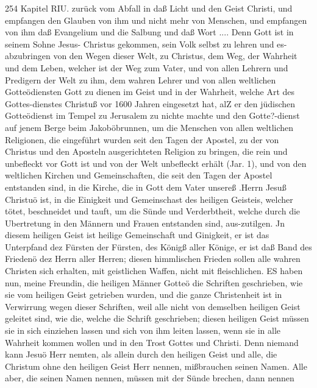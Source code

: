 254 Kapitel RIU.
zurück vom Abfall in daß Licht und den Geist Christi, und
empfangen den Glauben von ihm und nicht mehr von Menschen,
und empfangen von ihm daß Evangelium und die Salbung und
daß Wort .... Denn Gott ist in seinem Sohne Jesus- Christus
gekommen, sein Volk selbst zu lehren und es- abzubringen von
den Wegen dieser Welt, zu Christus, dem Weg, der Wahrheit
und dem Leben, welcher ist der Weg zum Vater, und von allen
Lehrern und Predigern der Welt zu ihm, dem wahren Lehrer
und von allen weltlichen Gotteödiensten Gott zu dienen
im Geist und in der Wahrheit, welche Art des Gottes-dienstes
Christuß vor 1600 Jahren eingesetzt hat, alZ er den jüdischen
Gotteödienst im Tempel zu Jerusalem zu nichte machte und den
Gotte?-dienst auf jenem Berge beim Jakoböbrunnen, um die
Menschen von allen weltlichen Religionen, die eingeführt wurden
seit den Tagen der Apostel, zu der von Christus und den Aposteln
ausgerichteten Religion zu bringen, die rein und unbefleckt vor
Gott ist und von der Welt unbefleckt erhält (Jar. 1), und von den
weltlichen Kirchen und Gemeinschaften, die seit den Tagen der
Apostel entstanden sind, in die Kirche, die in Gott dem Vater
unsereß .Herrn Jesuß Christuö ist, in die Einigkeit und Gemeinschast
des heiligen Geisteis, welcher tötet, beschneidet und tauft, um die
Sünde und Verderbtheit, welche durch die Ubertretung in den
Männern und Frauen entstanden sind, aus-zutilgen. Jn diesem
heiligen Geist ist heilige Gemeinschaft und Ginigkeit, er ist das
Unterpfand dez Fürsten der Fürsten, des Königß aller Könige,
er ist daß Band des Friedenö dez Herrn aller Herren; diesen
himmlischen Frieden sollen alle wahren Christen sich erhalten, mit
geistlichen Waffen, nicht mit fleischlichen.
ES haben nun, meine Freundin, die heiligen Männer Gotteö
die Schriften geschrieben, wie sie vom heiligen Geist getrieben
wurden, und die ganze Christenheit ist in Verwirrung wegen dieser
Schriften, weil alle nicht von demselben heiligen Geist geleitet sind,
wie die, welche die Schrift geschrieben; diesen heiligen Geist müssen
sie in sich einziehen lassen und sich von ihm leiten lassen, wenn
sie in alle Wahrheit kommen wollen und in den Trost Gottes
und Christi. Denn niemand kann Jesuö Herr nemten, als allein
durch den heiligen Geist und alle, die Christum ohne den heiligen
Geist Herr nennen, mißbrauchen seinen Namen. Alle aber, die
seinen Namen nennen, müssen mit der Sünde brechen, dann nennen


